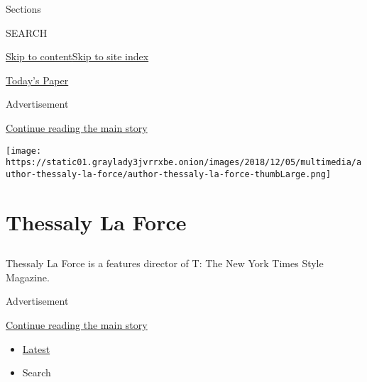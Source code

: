 Sections

SEARCH

\protect\hyperlink{site-content}{Skip to
content}\protect\hyperlink{site-index}{Skip to site index}

\href{https://myaccount.nytimes3xbfgragh.onion/auth/login?response_type=cookie\&client_id=vi}{}

\href{https://www.nytimes3xbfgragh.onion/section/todayspaper}{Today's
Paper}

Advertisement

\protect\hyperlink{after-top}{Continue reading the main story}

\texttt{[image: https://static01.graylady3jvrrxbe.onion/images/2018/12/05/multimedia/author-thessaly-la-force/author-thessaly-la-force-thumbLarge.png]}

\hypertarget{thessaly-la-force}{%
\section{Thessaly La Force}\label{thessaly-la-force}}

\subsection{}

Thessaly La Force is a features director of T: The New York Times Style
Magazine.

Advertisement

\protect\hyperlink{after-mid1}{Continue reading the main story}

\begin{itemize}
\tightlist
\item
  \protect\hyperlink{stream-panel}{Latest}
\item
  Search
\end{itemize}

